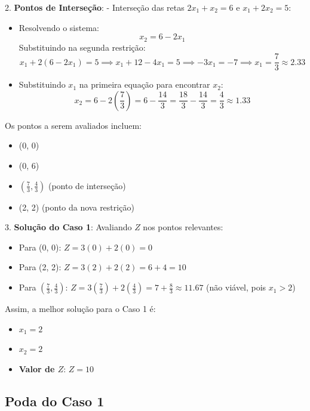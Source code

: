 \documentclass{article}
\begin{document}
2. \textbf{Pontos de Interseção}:
   - Interseção das retas \(2x_1 + x_2 = 6\) e \(x_1 + 2x_2 = 5\):
     \begin{itemize}
         \item Resolvendo o sistema:
         \[
         x_2 = 6 - 2x_1
         \]
         Substituindo na segunda restrição:
         \[
         x_1 + 2(6 - 2x_1) = 5 \implies x_1 + 12 - 4x_1 = 5 \implies -3x_1 = -7 \implies x_1 = \frac{7}{3} \approx 2.33
         \]
         \item Substituindo \(x_1\) na primeira equação para encontrar \(x_2\):
         \[
         x_2 = 6 - 2\left(\frac{7}{3}\right) = 6 - \frac{14}{3} = \frac{18}{3} - \frac{14}{3} = \frac{4}{3} \approx 1.33
         \]
     \end{itemize}

Os pontos a serem avaliados incluem:
   \begin{itemize}
       \item (0, 0)
       \item (0, 6)
       \item \(\left(\frac{7}{3}, \frac{4}{3}\right)\) (ponto de interseção)
       \item (2, 2) (ponto da nova restrição)
   \end{itemize}

3. \textbf{Solução do Caso 1}:
   Avaliando \(Z\) nos pontos relevantes:
   \begin{itemize}
       \item Para (0, 0): \(Z = 3(0) + 2(0) = 0\)
       \item Para (2, 2): \(Z = 3(2) + 2(2) = 6 + 4 = 10\)
       \item Para \(\left(\frac{7}{3}, \frac{4}{3}\right)\): \(Z = 3\left(\frac{7}{3}\right) + 2\left(\frac{4}{3}\right) = 7 + \frac{8}{3} \approx 11.67\) (não viável, pois \(x_1 > 2\))
   \end{itemize}

Assim, a melhor solução para o Caso 1 é:
\begin{itemize}
    \item \(x_1 = 2\)
    \item \(x_2 = 2\)
    \item \textbf{Valor de \(Z\)}: \(Z = 10\)
\end{itemize}

\subsection{Poda do Caso 1}
\end{document}
